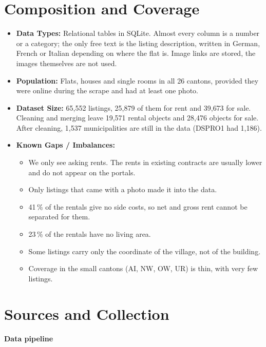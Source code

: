 \documentclass[11pt, a4paper]{article}
\begin{document}
\section{Composition and Coverage}
\begin{itemize}
    \item \textbf{Data Types:} Relational tables in SQLite. Almost every column is a number or a category; the only free text is the listing description, written in German, French or Italian depending on where the flat is. Image links are stored, the images themselves are not used.
    \item \textbf{Population:} Flats, houses and single rooms in all 26 cantons, provided they were online during the scrape and had at least one photo.
    \item \textbf{Dataset Size:} 65{,}552 listings, 25{,}879 of them for rent and 39{,}673 for sale. Cleaning and merging leave 19{,}571 rental objects and 28{,}476 objects for sale. After cleaning, 1{,}537 municipalities are still in the data (DSPRO1 had 1{,}186).
    \item \textbf{Known Gaps / Imbalances:}
    \begin{itemize}
        \item We only see asking rents. The rents in existing contracts are usually lower and do not appear on the portals.
        \item Only listings that came with a photo made it into the data.
        \item 41\,\% of the rentals give no side costs, so net and gross rent cannot be separated for them.
        \item 23\,\% of the rentals have no living area.
        \item Some listings carry only the coordinate of the village, not of the building.
        \item Coverage in the small cantons (AI, NW, OW, UR) is thin, with very few listings.
    \end{itemize}
\end{itemize}

\section{Sources and Collection}

\textbf{Data pipeline}
\end{document}
